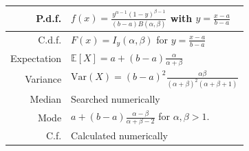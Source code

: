 \documentclass[a4paper,11pt]{article}
\theoremstyle{plain}
\theoremstyle{definition}
\newcommand{\ME}{\mathbb{E}}
\newcommand{\Var}{\mathrm{Var}}
\begin{document}
\begin{figure}[!htb]
\begin{minipage}{0.4\textwidth}
\begin{tabular}{| r | l |}
			\hline
			P.d.f. & $f(x) = \frac{y^{\alpha - 1}(1 - y)^{\beta - 1}}{(b-a)B(\alpha, \beta)}$ with $y = \frac{x - a}{b - a}$ \\
			\hline
			C.d.f. & $F(x)=I_{y}(\alpha, \beta)$ for $y = \frac{x - a}{b - a}$\\
			\hline
			Expectation & $\ME[X] = a + (b-a)\frac{\alpha}{\alpha + \beta}$ \\
			\hline
			Variance & $\Var(X) = (b-a)^2\frac{ \alpha \beta}{(\alpha + \beta)^2 (\alpha + \beta + 1)}$ \\
			\hline
			Median & Searched numerically \\
			\hline
			Mode & $a + (b-a)\frac{\alpha - \beta}{\alpha + \beta - 2}$ for $\alpha, \beta > 1$. \\
			\hline
			C.f. & Calculated numerically \\
			\hline
		\end{tabular}
	\end{minipage}
	\end{figure}
\end{document}
